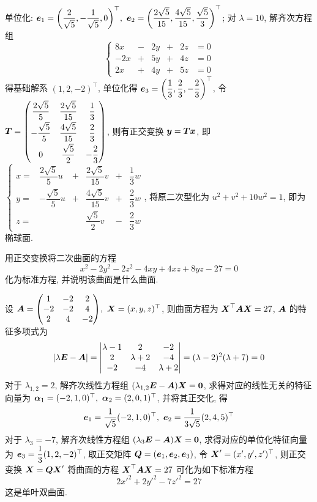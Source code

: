 \begin{solution}
    单位化: $\vb*{e}_1=\qty(\dfrac{2}{\sqrt{5}},-\dfrac{1}{\sqrt{5}},0)^\top,~\vb*{e}_2=\qty(\dfrac{2\sqrt{5}}{15},\dfrac{4\sqrt{5}}{15},\dfrac{\sqrt{5}}{3})^\top$; 对 $\lambda=10$, 解齐次方程组
    $$\left\{\begin{matrix}
            8x  & - & 2y & + & 2z & =0 \\
            -2x & + & 5y & + & 4z & =0 \\
            2x  & + & 4y & + & 5z & =0
        \end{matrix}\right.$$ 得基础解系 $(1,2,-2)^\top$, 单位化得 $\vb*{e}_3=\qty(\dfrac{1}{3},\dfrac{2}{3},-\dfrac{2}{3})^\top$, 令 $\vb*{T}=\begin{pmatrix}
            \dfrac{2\sqrt{5} }{5} & \dfrac{2\sqrt{5}}{15} & \dfrac{1}{3}  \\[6pt]
            -\dfrac{\sqrt5}{5}    & \dfrac{4\sqrt{5}}{15} & \dfrac{2}{3}  \\[6pt]
            0                     & \dfrac{\sqrt5}{2}     & -\dfrac{2}{3}
        \end{pmatrix}$, 则有正交变换 $\vb*{y}=\vb*{Tx}$, 即 $\left\{\begin{matrix}
            x= & \dfrac{2\sqrt{5} }{5} u & + & \dfrac{2\sqrt{5}}{15}v & + & \dfrac{1}{3}w  \\[6pt]
            y= & -\dfrac{\sqrt5}{5}u     & + & \dfrac{4\sqrt{5}}{15}v & + & \dfrac{2}{3}w  \\[6pt]
            z= &                         &   & \dfrac{\sqrt5}{2}  v   & - & \dfrac{2}{3} w
        \end{matrix}\right.$, 将原二次型化为 $u^2+v^2+10w^2=1$, 即为椭球面.
\end{solution}

\begin{example}
    用正交变换将二次曲面的方程 $$x^2-2y^2-2z^2-4xy+4xz+8yz-27=0$$ 化为标准方程, 并说明该曲面是什么曲面.
\end{example}
\begin{solution}
    设 $\vb*{A}=\mqty(1&-2&2\\-2&-2&4\\2&4&-2),~\vb*{X}=(x,y,z)^\top$, 则曲面方程为 $\vb*{X}^\top\vb*{AX}=27$, $\vb*{A}$ 的特征多项式为
    $$|\lambda\vb*{E}-\vb*{A}|=\mqty|\lambda-1&2&-2\\2&\lambda+2&-4\\-2&-4&\lambda+2|=(\lambda-2)^2(\lambda+7)=0$$
    对于 $\lambda_{1,2}=2$, 解齐次线性方程组 $(\lambda_{1,2}\vb*{E}-\vb*{A})\vb*{X}=\vb*{0}$, 求得对应的线性无关的特征向量为 $\vb*{\alpha}_1=(-2,1,0)^\top,~\vb*{\alpha}_2=(2,0,1)^\top$, 并将其正交化, 得
    $$\vb*{e}_1=\dfrac{1}{\sqrt{5}}(-2,1,0)^\top,~\vb*{e}_2=\dfrac{1}{3\sqrt{5}}(2,4,5)^\top$$
    对于 $\lambda_3=-7$, 解齐次线性方程组 $(\lambda_3\vb*{E}-\vb*{A})\vb*{X}=\vb*{0}$, 求得对应的单位化特征向量为 $\vb*{e}_3=\dfrac{1}{3}(1,2,-2)^\top$,
    取正交矩阵 $\vb*{Q}=(\vb*{e}_1,\vb*{e}_2,\vb*{e}_3)$, 令 $\vb*{X}'=(x',y',z')^\top$, 则正交变换 $\vb*{X}=\vb*{QX}'$ 将曲面的方程 $\vb*{X}^\top\vb*{AX}=27$ 可化为如下标准方程
    $$2x'^2+2y'^2-7z'^2=27$$ 这是单叶双曲面.
\end{solution}

